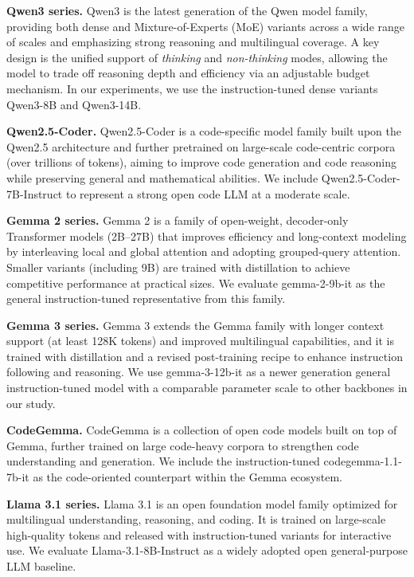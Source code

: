\documentclass[acmsmall,screen,review,anonymous]{acmart}
\begin{document}
\noindent\textbf{Qwen3 series.}
Qwen3 \cite{yang2025qwen3} is the latest generation of the Qwen model family, providing both dense and Mixture-of-Experts (MoE) variants across a wide range of scales and emphasizing strong reasoning and multilingual coverage. A key design is the unified support of \emph{thinking} and \emph{non-thinking} modes, allowing the model to trade off reasoning depth and efficiency via an adjustable budget mechanism. In our experiments, we use the instruction-tuned dense variants Qwen3-8B and Qwen3-14B.

\noindent\textbf{Qwen2.5-Coder.}
Qwen2.5-Coder \cite{hui2024qwen2} is a code-specific model family built upon the Qwen2.5 architecture and further pretrained on large-scale code-centric corpora (over trillions of tokens), aiming to improve code generation and code reasoning while preserving general and mathematical abilities. We include Qwen2.5-Coder-7B-Instruct to represent a strong open code LLM at a moderate scale.

\noindent\textbf{Gemma 2 series.}
Gemma 2 \cite{team2024gemma} is a family of open-weight, decoder-only Transformer models (2B--27B) that improves efficiency and long-context modeling by interleaving local and global attention and adopting grouped-query attention. Smaller variants (including 9B) are trained with distillation to achieve competitive performance at practical sizes. We evaluate gemma-2-9b-it as the general instruction-tuned representative from this family.

\noindent\textbf{Gemma 3 series.}
Gemma 3 \cite{team2025gemma} extends the Gemma family with longer context support (at least 128K tokens) and improved multilingual capabilities, and it is trained with distillation and a revised post-training recipe to enhance instruction following and reasoning. We use gemma-3-12b-it as a newer generation general instruction-tuned model with a comparable parameter scale to other backbones in our study.

\noindent\textbf{CodeGemma.}
CodeGemma \cite{team2024codegemma} is a collection of open code models built on top of Gemma, further trained on large code-heavy corpora to strengthen code understanding and generation. We include the instruction-tuned codegemma-1.1-7b-it as the code-oriented counterpart within the Gemma ecosystem.

\noindent\textbf{Llama 3.1 series.}
Llama 3.1 \cite{grattafiori2024llama} is an open foundation model family optimized for multilingual understanding, reasoning, and coding. It is trained on large-scale high-quality tokens and released with instruction-tuned variants for interactive use. We evaluate Llama-3.1-8B-Instruct as a widely adopted open general-purpose LLM baseline.
\end{document}
